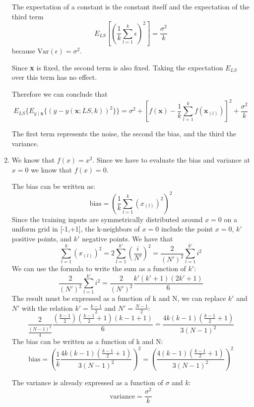\documentclass[a4paper,10pt]{article}
\begin{document}
\begin{enumerate}
    The expectation of a constant is the constant itself and the expectation of the third term
    $$
    E_{LS}\left[\left(\frac{1}{k}\sum^k_{l=1}\epsilon\right)^2\right] = \frac{\sigma^2}{k}
    $$
    because $\text{Var}(\epsilon) = \sigma^2$.

    Since \textbf{x} is fixed, the second term is also fixed. Taking the expectation $E_{LS}$ over this term has no effect.

    Therefore we can conclude that
    $$
    E_{LS}\{E_{y\mid \textbf{x}}\{(y - \hat{y}(\textbf{x};LS,k))^2\}\} =
    \sigma^2
    + \left[f(\textbf{x})-\frac{1}{k}\sum^k_{l=1}f(\textbf{x}_{(l)})\right]^2
    + \frac{\sigma^2}{k}
    $$

    The first term represents the noise, the second the bias, and the third the variance. 

    \item 
    We know that $f(x) = x^2$. Since we have to evaluate the bias and variance at $x = 0$ we know that $f(x) = 0$.

    The bias can be written as:
    $$
    \text{bias} = \left(\frac{1}{k}\sum^k_{l=1}({x}_{(l)})^2\right)^2
    $$
    Since the training inputs are symmetrically distributed around $x=0$ on a uniform grid in [-1,+1], the k-neighbors of $x=0$ include the point $x=0$, $k'$ positive points, and $k'$ negative points. We have that
    $$
    \sum^k_{l=1}({x}_{(l)})^2 = 2\sum^{k'}_{l=1}\left(\frac{i}{N'}\right)^2 = \frac{2}{(N')^2}\sum^{k'}_{l=1}i^2
    $$
    We can use the formula to write the sum as a function of $k'$:
    $$
    \frac{2}{(N')^2}\sum^{k'}_{l=1}i^2 = \frac{2}{(N')^2}\frac{k'(k'+1)(2k'+1)}{6}
    $$
    The result must be expressed as a function of k and N, we can replace $k'$ and $N'$ with the relation $k' = \frac{k-1}{2}$ and $N' = \frac{N-1}{2}$:
    $$
    \frac{2}{\frac{(N-1)^2}{4}}\frac{(\frac{k-1}{2})(\frac{k-1}{2}+1)(k-1+1)}{6} = \frac{4k(k-1)(\frac{k-1}{2}+1)}{3(N-1)^2}
    $$
    The bias can be written as a function of k and N:
    $$
    \text{bias} = \left(\frac{1}{k}\frac{4k(k-1)(\frac{k-1}{2}+1)}{3(N-1)^2}\right)^2 =  \left(\frac{4(k-1)(\frac{k-1}{2}+1)}{3(N-1)^2}\right)^2 
    $$


    The variance is already expressed as a function of $\sigma$ and $k$:
    $$
    \text{variance} = \frac{\sigma^2}{k}
    $$


\end{enumerate}
\end{document}
